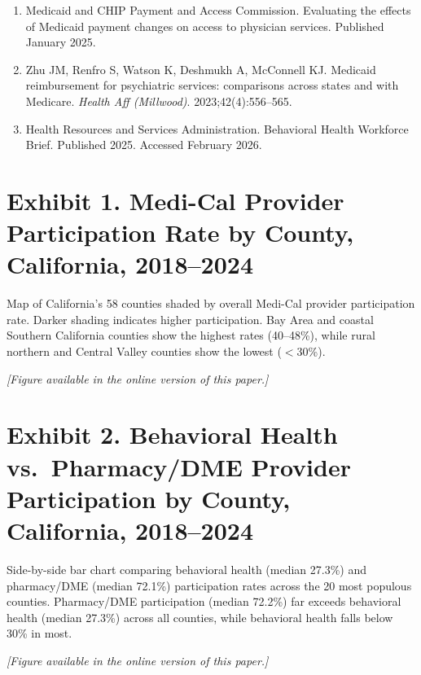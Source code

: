 \documentclass[12pt]{article}
\begin{document}
\begin{enumerate}
\item Medicaid and CHIP Payment and Access Commission. Evaluating the effects of Medicaid payment changes on access to physician services. Published January 2025.

\item Zhu JM, Renfro S, Watson K, Deshmukh A, McConnell KJ. Medicaid reimbursement for psychiatric services: comparisons across states and with Medicare. \textit{Health Aff (Millwood)}. 2023;42(4):556--565.

\item Health Resources and Services Administration. Behavioral Health Workforce Brief. Published 2025. Accessed February 2026.
\end{enumerate}


\newpage
\section*{Exhibit 1. Medi-Cal Provider Participation Rate by County, California, 2018--2024}

Map of California's 58 counties shaded by overall Medi-Cal provider participation rate. Darker shading indicates higher participation. Bay Area and coastal Southern California counties show the highest rates (40--48\%), while rural northern and Central Valley counties show the lowest ($<$30\%).

\textit{[Figure available in the online version of this paper.]}

\vspace{1cm}

\section*{Exhibit 2. Behavioral Health vs.\ Pharmacy/DME Provider Participation by County, California, 2018--2024}

Side-by-side bar chart comparing behavioral health (median 27.3\%) and pharmacy/DME (median 72.1\%) participation rates across the 20 most populous counties. Pharmacy/DME participation (median 72.2\%) far exceeds behavioral health (median 27.3\%) across all counties, while behavioral health falls below 30\% in most.

\textit{[Figure available in the online version of this paper.]}

\end{document}
